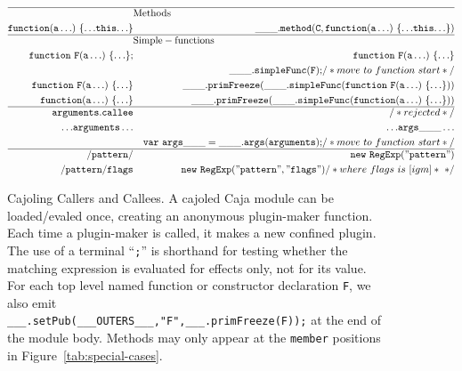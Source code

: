 \documentclass[letterpaper,twocolumn,10pt]{article}
\newcommand{\code}[1]{{\tt {#1}}}              %
\begin{document}
\begin{figure}
\begin{eqnarray}
  \hline
   \nonumber & \lefteqn{\mathrm{Methods}} & \\
  \code{function(a\ldots)\ \{{\ldots}this{\ldots}\}}         
             & \label{member:method}  & \code{\_\_\_.method(C,function(a\ldots)\ \{{\ldots}this{\ldots}\})} \\
  \hline
   \nonumber & \lefteqn{\mathrm{Simple-functions}} & \\
  \code{function\ F(a\ldots)\ \{{\ldots}\};} 
             & \label{func:named-decl} & \code{function\ F(a\ldots)\ \{{\ldots}\}} \\
             & \nonumber               & \code{\_\_\_.simpleFunc(F);} /*move\ to\ function\ start*/ \\
  \code{function\ F(a\ldots)\ \{{\ldots}\}}      
             & \label{func:named-expr}
                                 & \code{\_\_\_.primFreeze(\_\_\_.simpleFunc(function\ F(a\ldots)\ \{{\ldots}\}))} \\
  \code{function(a\ldots)\ \{{\ldots}\}}         
             & \label{func:anon} & \code{\_\_\_.primFreeze(\_\_\_.simpleFunc(function(a\ldots)\ \{{\ldots}\}))} \\ 
  \hline
  \code{arguments.callee} 
             & \label{read:bad-callee} & /*rejected*/ \\
  \code{{\ldots}arguments\ldots} 
             & \label{read:args}   & \code{{\ldots}args\_\_\_\ldots} \\
             & \nonumber           & \code{var\ args\_\_\_ = \_\_\_.args(arguments);} /*move\ to\ function\ start*/\\ 
  \hline
  \code{/pattern/}      & \label{pattern:unary}                 & \code{new\ RegExp("pattern")} \\
  \code{/pattern/flags} & \label{pattern:binary}
                                   & \code{new\ RegExp("pattern", "flags")} /*where\ flags\ is\ [igm]*\ */
\end{eqnarray}

\caption[Cajoling Callers and Callees]{Cajoling Callers and Callees. A 
cajoled Caja module can be loaded/evaled once, creating an anonymous 
plugin-maker function. Each time a plugin-maker is called, it makes a new 
confined plugin. The use of a terminal ``\code{;}'' is shorthand for testing 
whether the matching expression is evaluated for effects only, not for its 
value. For each top level named function or constructor declaration \code{F}, we 
also emit \\
\code{\_\_\_.setPub(\_\_\_OUTERS\_\_\_,"F",\_\_\_.primFreeze(F));} at the end of the 
module body. Methods may only appear at the \code{member} positions in 
Figure~\ref{tab:special-cases}.}
\label{tab:call-xlate}
\end{figure}
\end{document}
